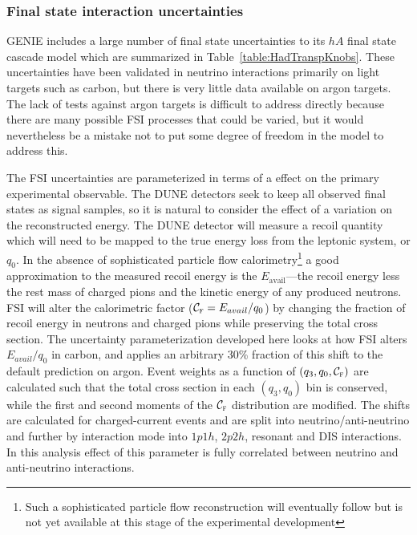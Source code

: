\subsubsection{Final state interaction uncertainties}\label{sec:fsi}
GENIE includes a large number of final state uncertainties to its $hA$ final state cascade model which are summarized in Table~\ref{table:HadTranspKnobs}.  These uncertainties have been validated in neutrino interactions primarily on light targets such as carbon, but there is very little data available on argon targets.
The lack of tests against argon targets is difficult to address directly because there are many possible FSI processes that could be varied, but it would nevertheless be a mistake not to put some degree of freedom in the model to address this.

The FSI uncertainties are parameterized in terms of a effect on the primary experimental observable. The DUNE detectors seek to keep all observed final states as signal samples, so it is natural to consider the effect of a variation on the reconstructed energy.  The DUNE detector will measure a recoil quantity which will need to be mapped to the true energy loss from the leptonic system, or $q_0$.  In the absence of sophisticated particle flow calorimetry\footnote{Such a sophisticated particle flow reconstruction will eventually follow but is not yet available at this stage of the experimental development} a good approximation to the measured recoil energy is the $E_\text{avail}$---the recoil energy less the rest mass of charged pions and the kinetic energy of any produced neutrons. FSI will alter the calorimetric factor ($\mathcal{C}_\textsc{f} = E_{avail}/q_0$) by changing the fraction of recoil energy in neutrons and charged pions while preserving the total cross section.
The uncertainty parameterization developed here looks at how FSI alters $E_{avail}/q_0$ in carbon, and applies an arbitrary 30\% fraction of this shift to the default prediction on argon.  Event weights as a function of $(q_3,q_0,\mathcal{C}_\textsc{f})$ are calculated such that the total cross section in each $(q_3,q_0)$ bin is conserved, while the first and second moments of the $\mathcal{C}_\textsc{f}$ distribution are modified. The shifts are calculated for charged-current events and are split into neutrino/anti-neutrino and further by interaction mode into $1p1h$, $2p2h$, resonant and DIS interactions. In this analysis effect of this parameter is fully correlated between neutrino and anti-neutrino interactions.

